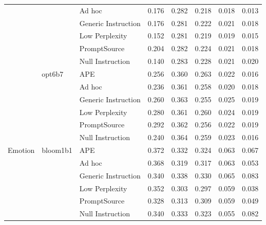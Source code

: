 \begin{supertabular}{lllrrrrr}
              &        & Ad hoc &            0.176 &           0.282 &          0.218 &        0.018 &    0.013 \\
              &        & Generic Instruction &            0.176 &           0.281 &          0.222 &        0.021 &    0.018 \\
              &        & Low Perplexity &            0.152 &           0.281 &          0.219 &        0.019 &    0.015 \\
              &        & PromptSource &            0.204 &           0.282 &          0.224 &        0.021 &    0.018 \\
              &        & Null Instruction &            0.140 &           0.283 &          0.228 &        0.021 &    0.020 \\
              & opt6b7 & APE &            0.256 &           0.360 &          0.263 &        0.022 &    0.016 \\
              &        & Ad hoc &            0.236 &           0.361 &          0.258 &        0.020 &    0.018 \\
              &        & Generic Instruction &            0.260 &           0.363 &          0.255 &        0.025 &    0.019 \\
              &        & Low Perplexity &            0.280 &           0.361 &          0.260 &        0.024 &    0.019 \\
              &        & PromptSource &            0.292 &           0.362 &          0.256 &        0.022 &    0.019 \\
              &        & Null Instruction &            0.240 &           0.364 &          0.259 &        0.023 &    0.016 \\
Emotion & bloom1b1 & APE &            0.372 &           0.332 &          0.324 &        0.063 &    0.067 \\
              &        & Ad hoc &            0.368 &           0.319 &          0.317 &        0.063 &    0.053 \\
              &        & Generic Instruction &            0.340 &           0.338 &          0.330 &        0.065 &    0.083 \\
              &        & Low Perplexity &            0.352 &           0.303 &          0.297 &        0.059 &    0.038 \\
              &        & PromptSource &            0.328 &           0.313 &          0.309 &        0.059 &    0.049 \\
              &        & Null Instruction &            0.340 &           0.333 &          0.323 &        0.055 &    0.082 \\

\end{supertabular}
